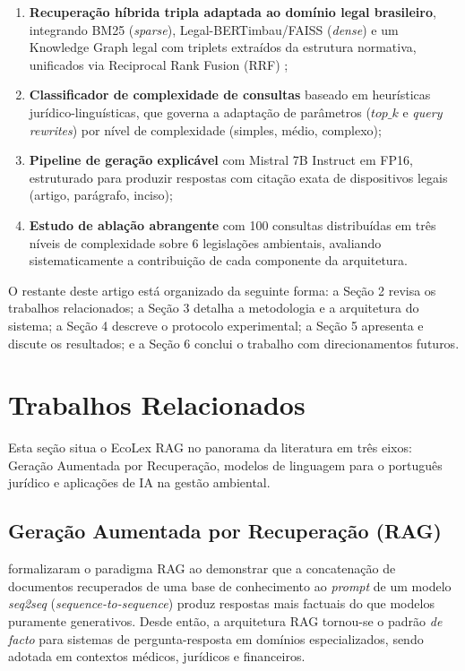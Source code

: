 \documentclass[12pt]{article}
\begin{document}
\begin{enumerate}
\item \textbf{Recuperação híbrida tripla adaptada ao domínio legal brasileiro}, integrando BM25 (\textit{sparse}), Legal-BERTimbau/FAISS (\textit{dense}) \cite{rufimelo:2022} e um Knowledge Graph legal com triplets extraídos da estrutura normativa, unificados via Reciprocal Rank Fusion (RRF) \cite{cormack:2009};
\item \textbf{Classificador de complexidade de consultas} baseado em heurísticas jurídico-linguísticas, que governa a adaptação de parâmetros ($top\_k$ e \textit{query rewrites}) por nível de complexidade (simples, médio, complexo);
\item \textbf{Pipeline de geração explicável} com Mistral 7B Instruct \cite{jiang:2023} em FP16, estruturado para produzir respostas com citação exata de dispositivos legais (artigo, parágrafo, inciso);
\item \textbf{Estudo de ablação abrangente} com 100 consultas distribuídas em três níveis de complexidade sobre 6 legislações ambientais, avaliando sistematicamente a contribuição de cada componente da arquitetura.
\end{enumerate}

O restante deste artigo está organizado da seguinte forma: a Seção 2 revisa os trabalhos relacionados; a Seção 3 detalha a metodologia e a arquitetura do sistema; a Seção 4 descreve o protocolo experimental; a Seção 5 apresenta e discute os resultados; e a Seção 6 conclui o trabalho com direcionamentos futuros.

\section{Trabalhos Relacionados}

Esta seção situa o EcoLex RAG no panorama da literatura em três eixos: Geração Aumentada por Recuperação, modelos de linguagem para o português jurídico e aplicações de IA na gestão ambiental.

\subsection{Geração Aumentada por Recuperação (RAG)}

\cite{lewis:2020} formalizaram o paradigma RAG ao demonstrar que a concatenação de documentos recuperados de uma base de conhecimento ao \textit{prompt} de um modelo \textit{seq2seq} (\textit{sequence-to-sequence}) produz respostas mais factuais do que modelos puramente generativos. Desde então, a arquitetura RAG tornou-se o padrão \textit{de facto} para sistemas de pergunta-resposta em domínios especializados, sendo adotada em contextos médicos, jurídicos e financeiros.
\end{document}
